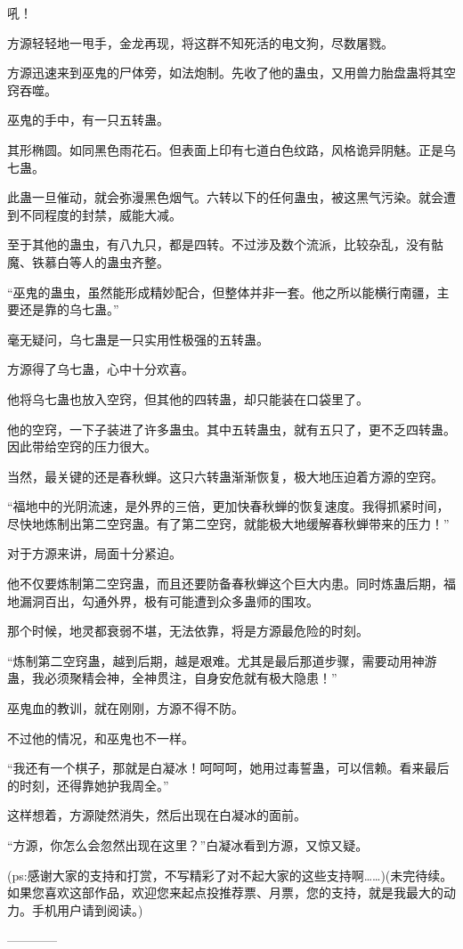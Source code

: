\begin{this_body}
吼！

方源轻轻地一甩手，金龙再现，将这群不知死活的电文狗，尽数屠戮。

方源迅速来到巫鬼的尸体旁，如法炮制。先收了他的蛊虫，又用兽力胎盘蛊将其空窍吞噬。

巫鬼的手中，有一只五转蛊。

其形椭圆。如同黑色雨花石。但表面上印有七道白色纹路，风格诡异阴魅。正是乌七蛊。

此蛊一旦催动，就会弥漫黑色烟气。六转以下的任何蛊虫，被这黑气污染。就会遭到不同程度的封禁，威能大减。

至于其他的蛊虫，有八九只，都是四转。不过涉及数个流派，比较杂乱，没有骷魔、铁慕白等人的蛊虫齐整。

“巫鬼的蛊虫，虽然能形成精妙配合，但整体并非一套。他之所以能横行南疆，主要还是靠的乌七蛊。”

毫无疑问，乌七蛊是一只实用性极强的五转蛊。

方源得了乌七蛊，心中十分欢喜。

他将乌七蛊也放入空窍，但其他的四转蛊，却只能装在口袋里了。

他的空窍，一下子装进了许多蛊虫。其中五转蛊虫，就有五只了，更不乏四转蛊。因此带给空窍的压力很大。

当然，最关键的还是春秋蝉。这只六转蛊渐渐恢复，极大地压迫着方源的空窍。

“福地中的光阴流速，是外界的三倍，更加快春秋蝉的恢复速度。我得抓紧时间，尽快地炼制出第二空窍蛊。有了第二空窍，就能极大地缓解春秋蝉带来的压力！”

对于方源来讲，局面十分紧迫。

他不仅要炼制第二空窍蛊，而且还要防备春秋蝉这个巨大内患。同时炼蛊后期，福地漏洞百出，勾通外界，极有可能遭到众多蛊师的围攻。

那个时候，地灵都衰弱不堪，无法依靠，将是方源最危险的时刻。

“炼制第二空窍蛊，越到后期，越是艰难。尤其是最后那道步骤，需要动用神游蛊，我必须聚精会神，全神贯注，自身安危就有极大隐患！”

巫鬼血的教训，就在刚刚，方源不得不防。

不过他的情况，和巫鬼也不一样。

“我还有一个棋子，那就是白凝冰！呵呵呵，她用过毒誓蛊，可以信赖。看来最后的时刻，还得靠她护我周全。”

这样想着，方源陡然消失，然后出现在白凝冰的面前。

“方源，你怎么会忽然出现在这里？”白凝冰看到方源，又惊又疑。

(ps:感谢大家的支持和打赏，不写精彩了对不起大家的这些支持啊……)(未完待续。如果您喜欢这部作品，欢迎您来起点投推荐票、月票，您的支持，就是我最大的动力。手机用户请到阅读。)

------------

\end{this_body}

